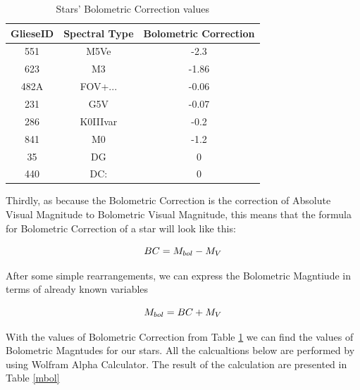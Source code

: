 \documentclass{article}
\begin{document}
\begin{table}[h]
    \begin{center}
      \caption{Stars' Bolometric Correction values}
      \begin{tabular}{c | c | c}
        \textbf{GlieseID} & \textbf{Spectral Type} & \textbf{Bolometric Correction}\\
        \hline
        551  & M5Ve     & -2.3\\
        623  & M3       & -1.86\\
        482A & FOV+...  & -0.06\\
        231  & G5V      & -0.07\\
        286  & K0IIIvar & -0.2\\
        841  & M0       & -1.2\\
        35   & DG       & 0\\
        440  & DC:      & 0\\
      \end{tabular}
      \label{bcv}
    \end{center}
  \end{table}
  
  Thirdly, as because the Bolometric Correction is the correction of Absolute Visual Magnitude to Bolometric Visual Magnitude, this means that the formula for Bolometric Correction of a star will look like this:

  \begin{equation}
    BC = M_{bol} - M_V\\
    \end{equation}

  After some simple rearrangements, we can express the Bolometric Magntiude in terms of already known variables

  \begin{equation}
    M_{bol} = BC + M_V\\
    \end{equation}

  With the values of Bolometric Correction from Table \ref{bcv} we can find the values of Bolometric Magntudes for our stars. All the calcualtions below are performed by using Wolfram Alpha Calculator. The result of the calculation are presented in Table \ref{mbol}\\
\end{document}
